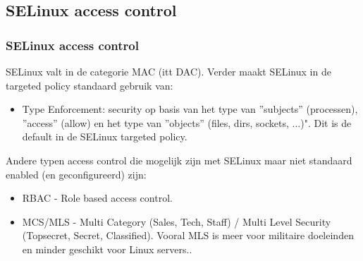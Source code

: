 \subsection{SELinux access control}
\begin{frame}
    \frametitle{SELinux access control}
\pause
SELinux valt in de categorie MAC (itt DAC). Verder maakt SELinux in de targeted policy standaard gebruik van:
\begin{itemize}
\item Type Enforcement: security op basis van het type van ''subjects'' (processen), ''access'' (allow) en het type van ''objects'' (files, dirs, sockets, ...)". Dit is de default in de SELinux targeted policy.
\end{itemize}
\pause
Andere typen access control die mogelijk zijn met SELinux maar niet standaard enabled (en geconfigureerd) zijn:
\begin{itemize}
\item RBAC - Role based access control.
\pause
\item MCS/MLS - Multi Category (Sales, Tech, Staff) / Multi Level Security (Topsecret, Secret, Classified). Vooral MLS is meer voor militaire doeleinden en minder geschikt voor Linux servers..
\end{itemize}
%
\end{frame}

